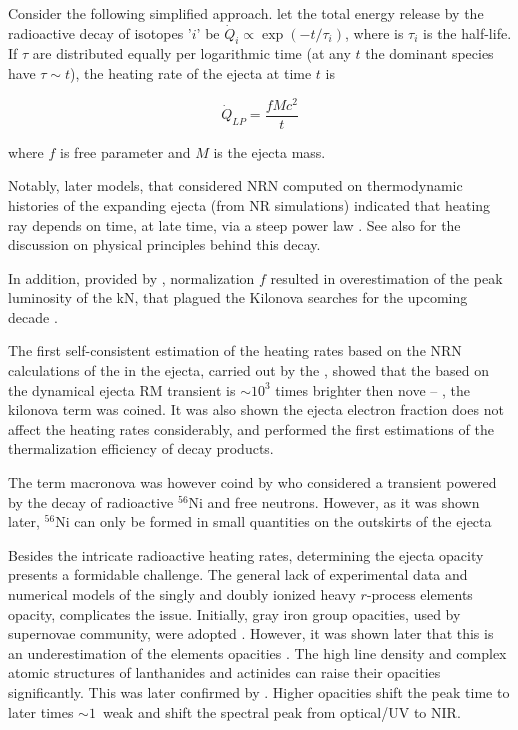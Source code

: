 Consider the following simplified approach. let the total energy release by the radioactive decay of isotopes '$i$' be $\dot{Q}_i \propto \exp(-t/\tau_i)$, where is $\tau_i$ is the half-life. If $\tau$ are distributed equally per logarithmic time (at any $t$ the dominant species have $\tau\sim t$), the heating rate of the ejecta at time $t$ is

\begin{equation}
\dot{Q}_{LP} = \frac{f M c^2}{t}
\end{equation}

where $f$ is free parameter and $M$ is the ejecta mass.

Notably, later models, that considered \ac{NRN} computed on thermodynamic histories of the expanding ejecta (from \ac{NR} simulations) indicated that heating ray depends on time, at late time, via a steep power law \citep{Metzger:2010,Roberts:2011,Korobkin:2012uy}. See also \citet{Hotokezaka:2017dbk}
for the discussion on physical principles behind this decay.

In addition, provided by \citet{Li:1998bw}, normalization $f$ resulted in overestimation of the peak luminosity of the \ac{kN}, that plagued the Kilonova searches for the upcoming decade \cite{Rosswog:2005su,Dong:2015oea,Bloom:2005qx,Kocevski:2009gv}. 

The first self-consistent estimation of the heating rates based on the \ac{NRN} calculations of the \rproc{} in the ejecta, carried out by the \citet{Metzger:2010}, showed that the based on the dynamical ejecta \ac{RM} transient is $\sim10^3$ times brighter then nove -- \ie, the kilonova term was coined. It was also shown the ejecta electron fraction does not affect the heating rates considerably, and performed the first estimations of the thermalization efficiency of decay products. 

The term macronova was however coind by \citet{Kulkarni:2005jw} who considered a transient powered by the decay of radioactive $^{56}$Ni and free neutrons. However, as it was shown later, $^{56}$Ni can only be formed in small quantities on the outskirts of the ejecta

Besides the intricate radioactive heating rates, determining the ejecta opacity presents a formidable challenge. 
The general lack of experimental data and numerical models of the singly and doubly ionized heavy $r$-process elements opacity, complicates the issue. Initially, gray iron group opacities, used by supernovae community, were adopted \citep{Roberts:2011}. However, it was shown later that this is an underestimation of the \rproc{} elements opacities \citep{Kasen:2013xka}. The high line density and complex atomic structures of lanthanides and actinides can raise their opacities significantly. This was later confirmed by \citep{Tanaka:2013ana} . Higher opacities shift the peak time to later times ${\sim}1$~weak \citep{Barnes:2013wka} and shift the spectral peak from optical/UV to \ac{NIR}.


